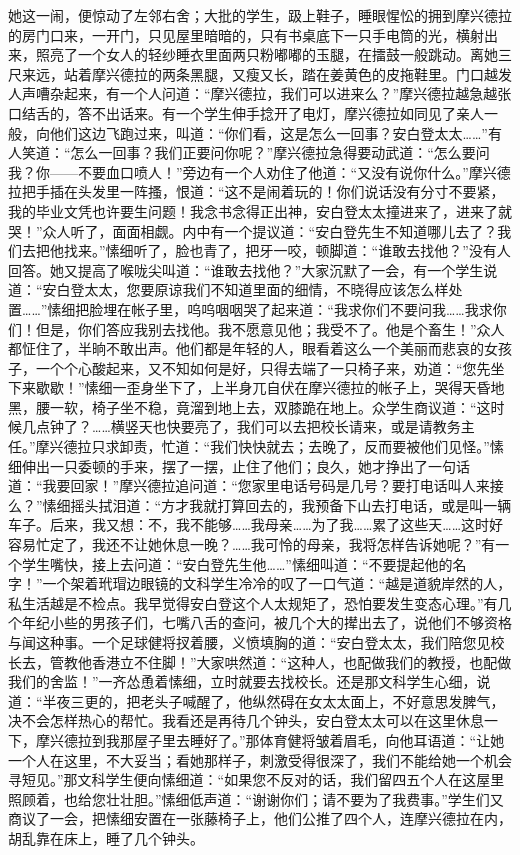 \par 她这一闹，便惊动了左邻右舍；大批的学生，趿上鞋子，睡眼惺忪的拥到摩兴德拉的房门口来，一开门，只见屋里暗暗的，只有书桌底下一只手电筒的光，横射出来，照亮了一个女人的轻纱睡衣里面两只粉嘟嘟的玉腿，在擂鼓一般跳动。离她三尺来远，站着摩兴德拉的两条黑腿，又瘦又长，踏在姜黄色的皮拖鞋里。门口越发人声嘈杂起来，有一个人问道：“摩兴德拉，我们可以进来么？”摩兴德拉越急越张口结舌的，答不出话来。有一个学生伸手捻开了电灯，摩兴德拉如同见了亲人一般，向他们这边飞跑过来，叫道：“你们看，这是怎么一回事？安白登太太……”有人笑道：“怎么一回事？我们正要问你呢？”摩兴德拉急得要动武道：“怎么要问我？你——不要血口喷人！”旁边有一个人劝住了他道：“又没有说你什么。”摩兴德拉把手插在头发里一阵搔，恨道：“这不是闹着玩的！你们说话没有分寸不要紧，我的毕业文凭也许要生问题！我念书念得正出神，安白登太太撞进来了，进来了就哭！”众人听了，面面相觑。内中有一个提议道：“安白登先生不知道哪儿去了？我们去把他找来。”愫细听了，脸也青了，把牙一咬，顿脚道：“谁敢去找他？”没有人回答。她又提高了喉咙尖叫道：“谁敢去找他？”大家沉默了一会，有一个学生说道：“安白登太太，您要原谅我们不知道里面的细情，不晓得应该怎么样处置……”愫细把脸埋在帐子里，呜呜咽咽哭了起来道：“我求你们不要问我……我求你们！但是，你们答应我别去找他。我不愿意见他；我受不了。他是个畜生！”众人都怔住了，半晌不敢出声。他们都是年轻的人，眼看着这么一个美丽而悲哀的女孩子，一个个心酸起来，又不知如何是好，只得去端了一只椅子来，劝道：“您先坐下来歇歇！”愫细一歪身坐下了，上半身兀自伏在摩兴德拉的帐子上，哭得天昏地黑，腰一软，椅子坐不稳，竟溜到地上去，双膝跪在地上。众学生商议道：“这时候几点钟了？……横竖天也快要亮了，我们可以去把校长请来，或是请教务主任。”摩兴德拉只求卸责，忙道：“我们快快就去；去晚了，反而要被他们见怪。”愫细伸出一只委顿的手来，摆了一摆，止住了他们；良久，她才挣出了一句话道：“我要回家！”摩兴德拉追问道：“您家里电话号码是几号？要打电话叫人来接么？”愫细摇头拭泪道：“方才我就打算回去的，我预备下山去打电话，或是叫一辆车子。后来，我又想：不，我不能够……我母亲……为了我……累了这些天……这时好容易忙定了，我还不让她休息一晚？……我可怜的母亲，我将怎样告诉她呢？”有一个学生嘴快，接上去问道：“安白登先生他……”愫细叫道：“不要提起他的名字！”一个架着玳瑁边眼镜的文科学生冷冷的叹了一口气道：“越是道貌岸然的人，私生活越是不检点。我早觉得安白登这个人太规矩了，恐怕要发生变态心理。”有几个年纪小些的男孩子们，七嘴八舌的查问，被几个大的撵出去了，说他们不够资格与闻这种事。一个足球健将扠着腰，义愤填胸的道：“安白登太太，我们陪您见校长去，管教他香港立不住脚！”大家哄然道：“这种人，也配做我们的教授，也配做我们的舍监！”一齐怂恿着愫细，立时就要去找校长。还是那文科学生心细，说道：“半夜三更的，把老头子喊醒了，他纵然碍在女太太面上，不好意思发脾气，决不会怎样热心的帮忙。我看还是再待几个钟头，安白登太太可以在这里休息一下，摩兴德拉到我那屋子里去睡好了。”那体育健将皱着眉毛，向他耳语道：“让她一个人在这里，不大妥当；看她那样子，刺激受得很深了，我们不能给她一个机会寻短见。”那文科学生便向愫细道：“如果您不反对的话，我们留四五个人在这屋里照顾着，也给您壮壮胆。”愫细低声道：“谢谢你们；请不要为了我费事。”学生们又商议了一会，把愫细安置在一张藤椅子上，他们公推了四个人，连摩兴德拉在内，胡乱靠在床上，睡了几个钟头。
